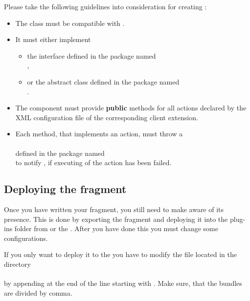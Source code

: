 Please take the following guidelines into consideration for creating
\gdtesterclasses:
\begin{itemize}
  \item The class must be compatible with .
  \item It must either implement
  \begin{itemize}
    \item the interface  defined in the package named\\
        ,\\
	 \item or the abstract class 
	     defined in the package named\\
	     .
  \end{itemize}
  \item The component must provide \textbf{public} methods for all actions
        declared by the XML configuration file of the corresponding \app{}
        client extension.
  \item Each method, that implements an action, must throw a\\
        \\
        defined in the package named\\
        to notify \app{}, if executing of the action has been failed.
\end{itemize}

\subsection{Deploying the fragment}

Once you have written your fragment, you still need to make \app{}
aware of its presence. This is done by exporting the fragment and
deploying it into the plug-ins folder from \app{} or the \gdagent.
After you have done this you must change some configurations.

If you only want to deploy it to the \gdagent you have to modify
the file  located in the directory\\
\\
by appending  at the end of the line starting with
. Make sure, that the bundles are divided by comma.

